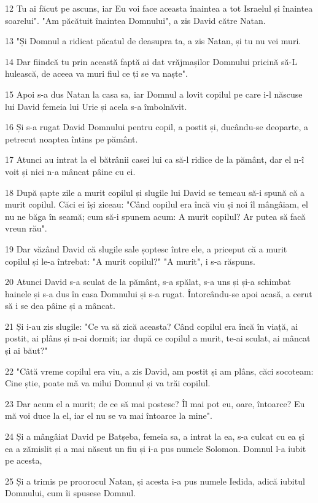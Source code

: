 \par 12 Tu ai făcut pe ascuns, iar Eu voi face aceasta înaintea a tot Israelul și înaintea soarelui". "Am păcătuit înaintea Domnului", a zis David către Natan.
\par 13 "Și Domnul a ridicat păcatul de deasupra ta, a zis Natan, și tu nu vei muri.
\par 14 Dar fiindcă tu prin această faptă ai dat vrăjmașilor Domnului pricină să-L hulească, de aceea va muri fiul ce ți se va naște".
\par 15 Apoi s-a dus Natan la casa sa, iar Domnul a lovit copilul pe care i-l născuse lui David femeia lui Urie și acela s-a îmbolnăvit.
\par 16 Și s-a rugat David Domnului pentru copil, a postit și, ducându-se deoparte, a petrecut noaptea întins pe pământ.
\par 17 Atunci au intrat la el bătrânii casei lui ca să-l ridice de la pământ, dar el n-î voit și nici n-a mâncat pâine cu ei.
\par 18 După șapte zile a murit copilul și slugile lui David se temeau să-i spună că a murit copilul. Căci ei își ziceau: "Când copilul era încă viu și noi îl mângâiam, el nu ne băga în seamă; cum să-i spunem acum: A murit copilul? Ar putea să facă vreun rău".
\par 19 Dar văzând David că slugile sale șoptesc între ele, a priceput că a murit copilul și le-a întrebat: "A murit copilul?" "A murit", i s-a răspuns.
\par 20 Atunci David s-a sculat de la pământ, s-a spălat, s-a uns și și-a schimbat hainele și s-a dus în casa Domnului și s-a rugat. Întorcându-se apoi acasă, a cerut să i se dea pâine și a mâncat.
\par 21 Și i-au zis slugile: "Ce va să zică aceasta? Când copilul era încă în viață, ai postit, ai plâns și n-ai dormit; iar după ce copilul a murit, te-ai sculat, ai mâncat și ai băut?"
\par 22 "Câtă vreme copilul era viu, a zis David, am postit și am plâns, căci socoteam: Cine știe, poate mă va milui Domnul și va trăi copilul.
\par 23 Dar acum el a murit; de ce să mai postesc? Îl mai pot eu, oare, întoarce? Eu mă voi duce la el, iar el nu se va mai întoarce la mine".
\par 24 Și a mângâiat David pe Batșeba, femeia sa, a intrat la ea, s-a culcat cu ea și ea a zămislit și a mai născut un fiu și i-a pus numele Solomon. Domnul l-a iubit pe acesta,
\par 25 Și a trimis pe proorocul Natan, și acesta i-a pus numele Iedida, adică iubitul Domnului, cum îi spusese Domnul.
